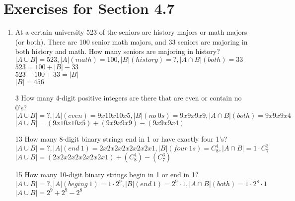 \documentclass[12pt]{article}
\begin{document}
\section*{Exercises for Section 4.7}
\begin{enumerate}
    \item At a certain university 523 of the seniors are history majors or math majors (or both). There are 100 senior math majors, and 33 seniors are majoring in both history and math. How many seniors are majoring in history?\\
	$|A\cup B| = 523, |A|(math) = 100, |B|(history) = ?, |A\cap B|(both) = 33$\\
	$523 = 100 + |B| - 33$\\
	$523-100+33=|B|$\\
	$|B| = 456$
    \item [3] How many 4-digit positive integers are there that are even or contain no 0’s?\\
	$|A \cup B| = ?, |A|(even) = 9x10x10x5, |B|(no\ 0s) = 9x9x9x9, |A\cap B|(both) = 9x9x9x4$\\
	$|A\cup B| = (9x10x10x5) + (9x9x9x9) - (9x9x9x4)$
    \item [13] How many 8-digit binary strings end in 1 or have exactly four 1’s?\\
	$|A\cup B| = ?, |A|(end\ 1) = 2x2x2x2x2x2x2x1, |B|(four\ 1s)=C_{8}^4, |A\cap B| = 1\cdot C_7^3$\\
	$|A\cup B| = (2x2x2x2x2x2x2x1) + (C_8^4) - (C_7^3)$ 
    \item [15] How many 10-digit binary strings begin in 1 or end in 1?
	$|A \cup B| = ?, |A|(beging \ 1) = 1\cdot 2^9, |B|(end\ 1) = 2^9 \cdot 1, |A\cap B|(both) = 1\cdot 2^8 \cdot 1$\\
	$|A\cup B| = 2^9 + 2^9 - 2^8$
\end{enumerate}
\end{document}
